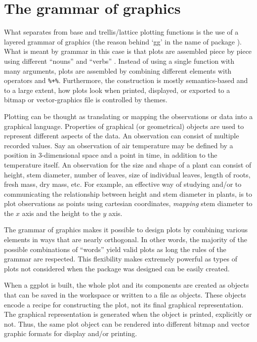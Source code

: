 \documentclass[krantz2]{krantz}\usepackage{knitr}
\begin{document}
\section{The grammar of graphics}\label{sec:plot:intro}
What separates \ggplot from base \Rlang and trellis/lattice plotting functions is the use of a layered grammar of graphics (the reason behind `gg' in the name of package ). What is meant by grammar in this case is that plots are assembled piece by piece using different ``nouns'' and ``verbs'' \autocite{Cleveland1985,Wickham2010}. Instead of using a single function with many arguments, plots are assembled by combining different elements with operators \code{+} and \verb|%+%|. Furthermore, the construction is mostly semantics-based and to a large extent, how plots look when printed, displayed, or exported to a bitmap or vector-graphics file is controlled by themes.

Plotting can be thought as translating or mapping the observations or data into a graphical language. Properties of graphical (or geometrical) objects are used to represent different aspects of the data. An observation can consist of multiple recorded values. Say an observation of air temperature may be defined by a position in 3-dimensional space and a point in time, in addition to the temperature itself. An observation for the size and shape of a plant can consist of height, stem diameter, number of leaves, size of individual leaves, length of roots, fresh mass, dry mass, etc. For example, an effective way of studying and/or to communicating the relationship between height and stem diameter in plants, is to plot observations as points using cartesian coordinates, \emph{mapping} stem diameter to the $x$ axis and the height to the $y$ axis.

The grammar of graphics makes it possible to design plots by combining various elements in ways that are nearly orthogonal. In other words, the majority of the possible combinations of ``words'' yield valid plots as long the rules of the grammar are respected. This flexibility makes \ggplot extremely powerful as types of plots not considered when the \ggplot package was designed can be easily created.

\begin{warningbox}
When a ggplot is built, the whole plot and its components are created as \Rlang objects that can be saved in the workspace or written to a file as \Rlang objects. These objects encode a recipe for constructing the plot, not its final graphical representation. The graphical representation is generated when the object is printed, explicitly or not. Thus, the same  plot object can be rendered into different bitmap and vector graphic formats for display and/or printing.
\end{warningbox}
\end{document}
